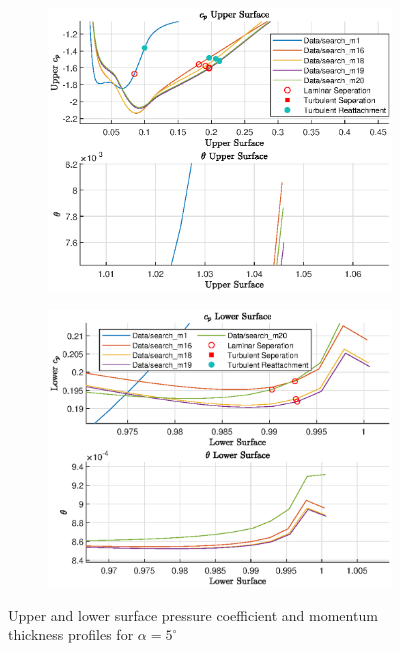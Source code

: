 \documentclass{article}
\begin{document}
\begin{figure}[H]
    \begin{subfigure}{0.49\textwidth}
        \centering
        \includegraphics[width=1.1\textwidth, center]{figures/loRe_upperprofile_20_a5.eps}
        \caption{}
        \label{fig:m20_uprofile}
    \end{subfigure}
    \begin{subfigure}{0.49\textwidth}
        \centering
        \includegraphics[width=1.1\textwidth, center]{figures/loRe_lowerprofile_20_a5.eps}
        \caption{}
        \label{fig:m20_lprofile}
    \end{subfigure}
    \caption{Upper and lower surface pressure coefficient and momentum thickness profiles for $\alpha = 5^\circ$}
\end{figure}
\end{document}
